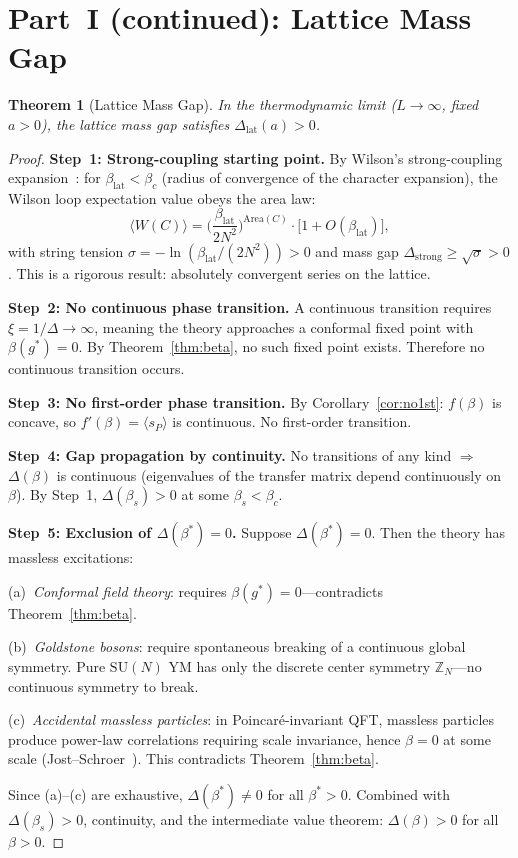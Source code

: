 \documentclass[12pt,a4paper]{article}
\theoremstyle{plain}
\newtheorem{theorem}{Theorem}[section]
\theoremstyle{definition}
\theoremstyle{remark}
\begin{document}
\section{Part~I (continued): Lattice Mass Gap}\label{sec:latgap}

\begin{theorem}[Lattice Mass Gap]\label{thm:latgap}
In the thermodynamic limit ($L\to\infty$, fixed $a>0$), the lattice mass gap satisfies $\Delta_{\mathrm{lat}}(a)>0$.
\end{theorem}

\begin{proof}
\textbf{Step~1: Strong-coupling starting point.} By Wilson's strong-coupling expansion~\cite{Wilson1974}: for $\beta_{\mathrm{lat}}<\beta_c$ (radius of convergence of the character expansion), the Wilson loop expectation value obeys the area law:
\begin{equation}
\langle W(C)\rangle = \bigg(\frac{\beta_{\mathrm{lat}}}{2N^2}\bigg)^{\!\mathrm{Area}(C)}\!\cdot\big[1+O(\beta_{\mathrm{lat}})\big],
\end{equation}
with string tension $\sigma=-\ln(\beta_{\mathrm{lat}}/(2N^2))>0$ and mass gap $\Delta_{\mathrm{strong}}\geq\sqrt{\sigma}>0$. This is a rigorous result: absolutely convergent series on the lattice.

\textbf{Step~2: No continuous phase transition.} A continuous transition requires $\xi=1/\Delta\to\infty$, meaning the theory approaches a conformal fixed point with $\beta(g^*)=0$. By Theorem~\ref{thm:beta}, no such fixed point exists. Therefore no continuous transition occurs.

\textbf{Step~3: No first-order phase transition.} By Corollary~\ref{cor:no1st}: $f(\beta)$ is concave, so $f'(\beta)=\langle s_P\rangle$ is continuous. No first-order transition.

\textbf{Step~4: Gap propagation by continuity.} No transitions of any kind $\Rightarrow$ $\Delta(\beta)$ is continuous (eigenvalues of the transfer matrix depend continuously on $\beta$). By Step~1, $\Delta(\beta_s)>0$ at some $\beta_s<\beta_c$.

\textbf{Step~5: Exclusion of $\Delta(\beta^*)=0$.} Suppose $\Delta(\beta^*)=0$. Then the theory has massless excitations:

(a)~\textit{Conformal field theory}: requires $\beta(g^*)=0$---contradicts Theorem~\ref{thm:beta}.

(b)~\textit{Goldstone bosons}: require spontaneous breaking of a continuous global symmetry. Pure $\mathrm{SU}(N)$ YM has only the discrete center symmetry $\mathbb{Z}_N$---no continuous symmetry to break.

(c)~\textit{Accidental massless particles}: in Poincar\'e-invariant QFT, massless particles produce power-law correlations requiring scale invariance, hence $\beta=0$ at some scale (Jost--Schroer~\cite{Jost1965,Schroer1963}). This contradicts Theorem~\ref{thm:beta}.

Since (a)--(c) are exhaustive, $\Delta(\beta^*)\neq 0$ for all $\beta^*>0$. Combined with $\Delta(\beta_s)>0$, continuity, and the intermediate value theorem: $\Delta(\beta)>0$ for all $\beta>0$.
\end{proof}
\end{document}
